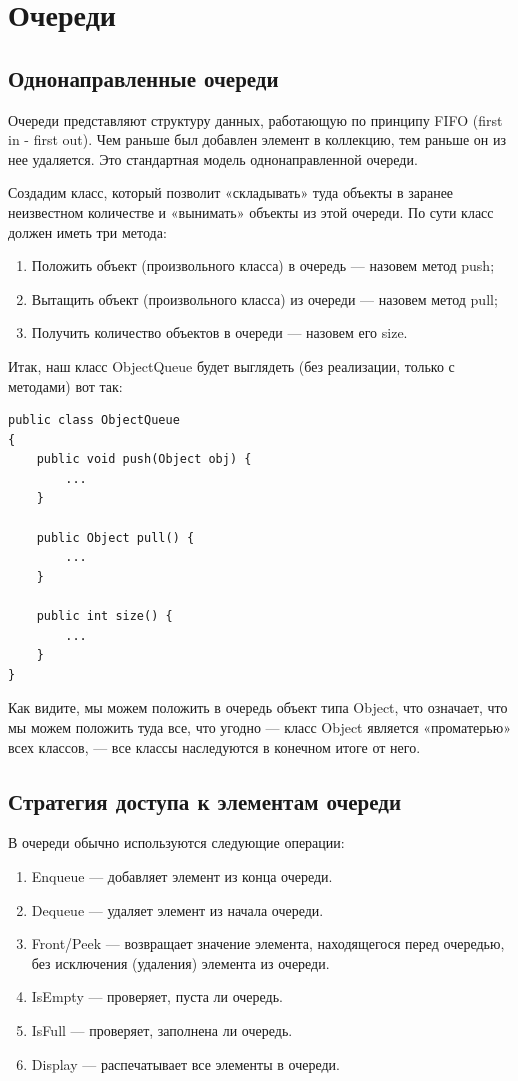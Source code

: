 
\newpage %
\chapter{Очереди}

\section{Однонаправленные очереди}

Очереди представляют структуру данных, работающую по принципу FIFO (first in - first out). Чем раньше был добавлен элемент в коллекцию, тем раньше он из нее удаляется. Это стандартная модель однонаправленной очереди.

Создадим класс, который позволит «складывать» туда объекты в заранее неизвестном количестве и «вынимать» объекты из этой очереди. По сути класс должен иметь три метода:
\begin{enumerate}
\item Положить объект (произвольного класса) в очередь — назовем метод push;
\item Вытащить объект (произвольного класса) из очереди — назовем метод pull;
\item Получить количество объектов в очереди — назовем его size.
\end{enumerate}

Итак, наш класс ObjectQueue будет выглядеть (без реализации, только с методами) вот так:


\begin{lstlisting}
public class ObjectQueue
{
    public void push(Object obj) {
        ...
    }
 
    public Object pull() {
        ...
    }
 
    public int size() {
        ...
    }
}
\end{lstlisting}

Как видите, мы можем положить в очередь объект типа Object, что означает, что мы можем положить туда все, что угодно — класс Object является «проматерью» всех классов, — все классы наследуются в конечном итоге от него.
\section{Стратегия доступа к элементам очереди}

В очереди обычно используются следующие операции:
\begin{enumerate}
\item Enqueue — добавляет элемент из конца очереди.
\item Dequeue — удаляет элемент из начала очереди.
\item Front/Peek — возвращает значение элемента, находящегося перед очередью, без исключения (удаления) элемента из очереди.
\item IsEmpty — проверяет, пуста ли очередь.
\item IsFull — проверяет, заполнена ли очередь.
\item Display — распечатывает все элементы в очереди.
\end{enumerate}

